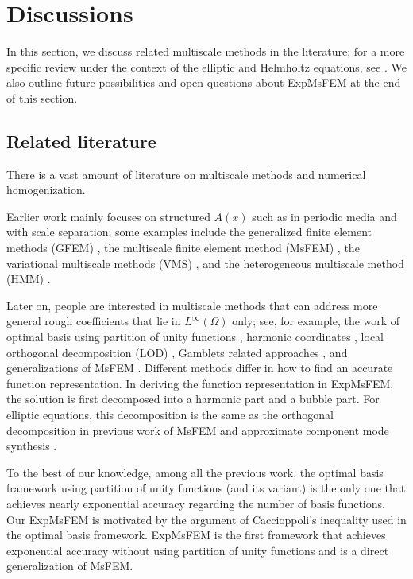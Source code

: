\documentclass[12pt]{caltech_thesis}
\numberwithin{equation}{section}
\begin{document}
\section{Discussions}
\label{sec: Discussions}
In this section, we discuss related multiscale methods in the literature; for a more specific review under the context of the elliptic and Helmholtz equations, see \cite{chen2021exponential,chen2023exponentially}. We also outline future possibilities and open questions about ExpMsFEM at the end of this section.
\subsection{Related literature}
There is a vast amount of literature on multiscale methods and numerical homogenization. 

Earlier work mainly focuses on structured $A(x)$ such as in periodic media and with scale separation; some examples include the generalized finite element methods (GFEM) \cite{babuvska1983generalized}, the multiscale finite element method (MsFEM) \cite{hou_multiscale_1997, hou1999convergence, efendiev2000convergence}, the variational multiscale methods (VMS) \cite{hughes_variational_1998}, and the heterogeneous multiscale method (HMM) \cite{abdulle2012heterogeneous}. 

Later on, people are interested in multiscale methods that can address more general rough coefficients that lie in $L^{\infty}(\Omega)$ only; see, for example, the work of optimal basis using partition of unity functions \cite{babuska2011optimal,babuvska2020multiscale, ma2021error, ma2021novel}, harmonic coordinates \cite{owhadi2007metric}, local orthogonal decomposition (LOD) \cite{malqvist_localization_2014,henning2013oversampling,kornhuber2018analysis, hauck2021super,maier2021high}, Gamblets related approaches \cite{owhadi2011localized,owhadi2014polyharmonic,owhadi2015bayesian,owhadi_multigrid_2017,hou_sparse_2017,owhadi2019operator, chen2020multiscale}, and generalizations of MsFEM \cite{hou2015optimal,chung2018constraint,li2019convergence,fu2019edge}. Different methods differ in how to find an accurate function representation. In deriving the function representation in ExpMsFEM, the solution is first decomposed into a harmonic part and a bubble part. For elliptic equations, this decomposition is the same as the orthogonal decomposition in previous work of MsFEM \cite{hou2015optimal} and approximate component mode synthesis \cite{hetmaniuk2010special,hetmaniuk2014error}.

To the best of our knowledge, among all the previous work, the optimal basis framework using partition of unity functions (and its variant) is the only one that achieves nearly exponential accuracy regarding the number of basis functions. Our ExpMsFEM \cite{chen2021exponential,chen2023exponentially} is motivated by the argument of Caccioppoli's inequality used in the optimal basis framework. ExpMsFEM is the first framework that achieves exponential accuracy without using partition of unity functions and is a direct generalization of MsFEM.
\end{document}
